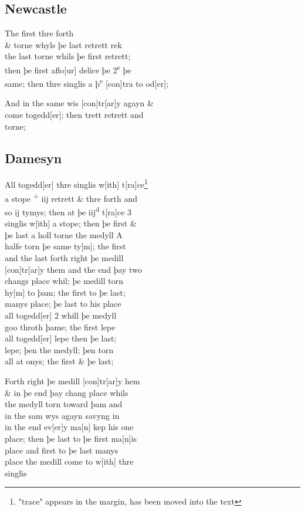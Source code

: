 \documentclass[12pt,letter]{article} %
\newcommand{\srcpg}[1]{
    \noindent{
        \color{Gray}{\rule[0.5ex]{\linewidth}{1pt}~#1} 
    
    }
}
\begin{document}
\subsection{Newcastle}
The first thre forth\\
\& torne whyls þe last retrett rek\\
the last torne whils þe first retrett;\\
then þe first aflo{[}ur{]} delice þe 2\textsuperscript{e} þe\\
same; then thre singlis a þ\textsuperscript{e} {[}con{]}tra to od{[}er{]};
\srcpg{68}
And in the same wis {[}con{]}tr{[}ar{]}y agayn \&\\
come togedd{[}er{]}; then trett retrett and\\
torne;

\subsection{Damesyn}
All togedd{[}er{]} thre singlis w{[}ith{]} {t{[}ra{]}ce}\footnote{"trace" appears in the margin, has been moved into the text}\\
a stope \textsuperscript{+} iij retrett \& thre forth and\\
so ij tymys; then at þe iij\textsuperscript{d} t{[}ra{]}ce 3\\
singlis w{[}ith{]} a stope; then þe first \&\\
þe last a holl torne the medyll A\\
halfe torn þe same ty{[}m{]}; the first\\
and the last forth right þe medill\\
{[}con{]}tr{[}ar{]}y them and the end þay two\\
changs place whil; þe medill torn\\
hy{[}m{]} to þam; the first to þe last;\\
manys place; þe last to his place\\
all togedd{[}er{]} 2 whill þe medyll\\
goo throth þame; the first lepe\\
all togedd{[}er{]} lepe then þe last;\\
lepe; þen the medyll; þen torn\\
all at onys; the first \& þe last; 
\srcpg{69} 
Forth right þe medill {[}con{]}tr{[}ar{]}y hem\\
\& in þe end þay chang place whils\\
the medyll torn toward þam and\\
in the sam wys agayn savyng in\\
in the end ev{[}er{]}y ma{[}n{]} kep his one\\
place; then þe last to þe first ma{[}n{]}is\\
place and first to þe last manys\\
place the medill come to w{[}ith{]} thre\\
singlis
\end{document}
